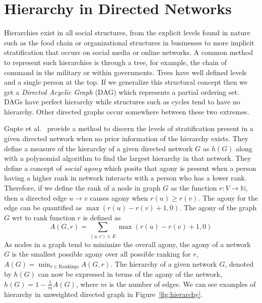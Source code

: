 \section{Hierarchy in Directed Networks}
\label{sec:hierarchy}
Hierarchies exist in all social structures, from the explicit levels found in nature such as the food chain or organizational structures in businesses to more implicit stratification that occurs on social media or online networks.
A common method to represent such hierarchies is through a tree, for example, the chain of command in the military or within governments.
Trees have well defined levels and a single person at the top.
If we generalize this structural concept then we get a \textit{Directed Acyclic Graph} (DAG) which represents a partial ordering set.
DAGs have perfect hierarchy while structures such as cycles tend to have no hierarchy.
Other directed graphs occur somewhere between these two extremes.

Gupte et al.\ \cite{gupte2011finding} provide a method to discern the levels of stratification present in a given directed network when no prior information of the hierarchy exists.
They define a measure of the hierarchy of a given directed network $G$ as $h(G)$ along with a polynomial algorithm to find the largest hierarchy in that network.
They define a concept of \textit{social agony} which posits that agony is present when a person having a higher rank in network interacts with a person who has a lower rank.
Therefore, if we define the rank of a node in graph $G$ as the function $r:V \rightarrow \mathbb{N}$, then a directed edge $u \rightarrow v$ causes agony when $r(u)\geq r(v)$.
The agony for the edge can be quantified as $\max(r(u)-r(v)+1,0)$.
The agony of the graph $G$ wrt to rank function $r$ is defined as 
\[A(G,r) =  \sum_{(u,v)\in E} \max(r(u)-r(v)+1,0)\]
As nodes in a graph tend to minimize the overall agony, the agony of a network $G$ is the smallest possible agony over all possible ranking for $r$, $A(G) = \min_{r\in \text{Rankings}}A(G,r)$.
The hierarchy of a given network $G$, denoted by $h(G)$ can now be expressed in terms of the agony of the network, $h(G)=1-\frac{1}{m}A(G)$, where $m$ is the number of edges.
We can see examples of hierarchy in unweighted directed graph in Figure~\ref{fig:hierarchy}.

